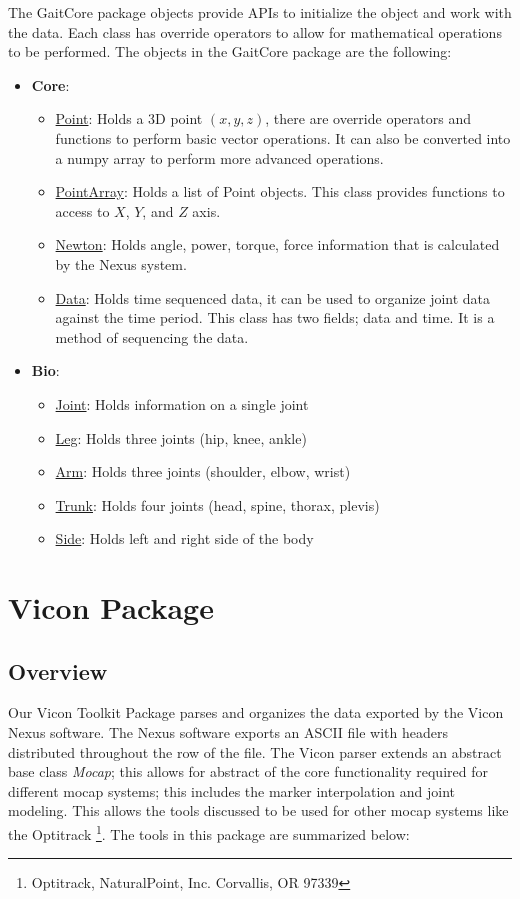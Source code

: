 The GaitCore package objects provide APIs to initialize the object and work with the data. Each class has override operators to allow for mathematical operations to be performed. The objects in the GaitCore package are the following:

\begin{itemize}[noitemsep]
\item \textbf{Core}:
\begin{itemize}[noitemsep]
    \item \underline{Point}: Holds a 3D point $(x,y,z)$, there are override operators and functions to perform basic vector operations. It can also be converted into a numpy array to perform more advanced operations.
    \item \underline{PointArray}: Holds a list of Point objects. This class provides functions to access to $X$, $Y$, and $Z$ axis. 
    \item \underline{Newton}: Holds angle, power, torque, force information that is calculated by the Nexus system. 
    \item \underline{Data}: Holds time sequenced data, it can be used to organize joint data against the time period. This class has two fields; data and time. It is a method of sequencing the data.  
\end{itemize}
\item \textbf{Bio}:
\begin{itemize}
    \item \underline{Joint}: Holds information on a single joint
    \item \underline{Leg}: Holds three joints (hip, knee, ankle)
    \item \underline{Arm}: Holds three joints (shoulder, elbow, wrist)
    \item \underline{Trunk}: Holds four joints (head, spine, thorax, plevis)
    \item \underline{Side}: Holds left and right side of the body
\end{itemize}
\end{itemize}




\section{Vicon Package}
\subsection{Overview}
Our Vicon Toolkit Package parses and organizes the data exported by the Vicon Nexus software. The Nexus software exports an ASCII file with headers distributed throughout the row of the file. The Vicon parser extends an abstract base class \textit{Mocap}; this allows for abstract of the core functionality required for different mocap systems; this includes the marker interpolation and joint modeling. This allows the tools discussed to be used for other mocap systems like the Optitrack \footnote{Optitrack, NaturalPoint, Inc. Corvallis, OR 97339}.  
 The tools in this package are summarized below: 

